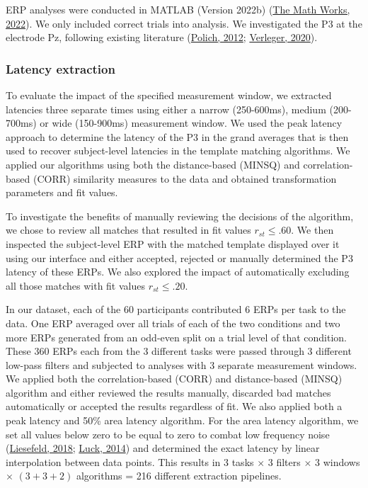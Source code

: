 \documentclass[
  man]{apa7}
\begin{document}
ERP analyses were conducted in MATLAB (Version 2022b) (\protect\hyperlink{ref-matlab2022b}{The Math Works, 2022}). We only included correct trials into analysis. We investigated the P3 at the electrode Pz, following existing literature (\protect\hyperlink{ref-polich2012neuropsychology}{Polich, 2012}; \protect\hyperlink{ref-verleger2020effects}{Verleger, 2020}).

\hypertarget{latency-extraction}{%
\subsubsection{Latency extraction}\label{latency-extraction}}

To evaluate the impact of the specified measurement window, we extracted latencies three separate times using either a narrow (250-600ms), medium (200-700ms) or wide (150-900ms) measurement window. We used the peak latency approach to determine the latency of the P3 in the grand averages that is then used to recover subject-level latencies in the template matching algorithms. We applied our algorithms using both the distance-based (MINSQ) and correlation-based (CORR) similarity measures to the data and obtained transformation parameters and fit values.

To investigate the benefits of manually reviewing the decisions of the algorithm, we chose to review all matches that resulted in fit values \(r_{st} \le .60\). We then inspected the subject-level ERP with the matched template displayed over it using our interface and either accepted, rejected or manually determined the P3 latency of these ERPs.
We also explored the impact of automatically excluding all those matches with fit values \(r_{st} \le .20\).

In our dataset, each of the 60 participants contributed 6 ERPs per task to the data. One ERP averaged over all trials of each of the two conditions and two more ERPs generated from an odd-even split on a trial level of that condition. These 360 ERPs each from the 3 different tasks were passed through 3 different low-pass filters and subjected to analyses with 3 separate measurement windows. We applied both the correlation-based (CORR) and distance-based (MINSQ) algorithm and either reviewed the results manually, discarded bad matches automatically or accepted the results regardless of fit. We also applied both a peak latency and 50\% area latency algorithm. For the area latency algorithm, we set all values below zero to be equal to zero to combat low frequency noise (\protect\hyperlink{ref-liesefeld2018estimating}{Liesefeld, 2018}; \protect\hyperlink{ref-luck2014introduction}{Luck, 2014}) and determined the exact latency by linear interpolation between data points. This results in 3 tasks \(\times\) 3 filters \(\times\) 3 windows \(\times\) \((3 + 3 + 2)\) algorithms = 216 different extraction pipelines.
\end{document}
